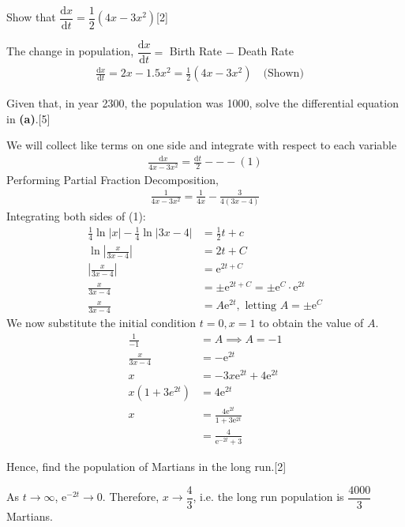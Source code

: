 \documentclass[12pt, a4 paper]{article}
\begin{document}
\begin{outline}[enumerate]
 \2 Show that $\dfrac{{{\textrm{d}}x}}{{{\textrm{d}}t}} = \dfrac{1}{2}(4x - 3{x^2})$\hfill[2]
 \begin{answer}
  The change in population, $\dfrac{{{\textrm{d}}x}}{{{\textrm{d}}t}} =$ Birth Rate $-$ Death Rate
  \begin{align*}
   \frac{{{\textrm{d}}x}}{{{\textrm{d}}t}} = 2x-1.5x^2 =\frac{1}{2}(4x - 3{x^2}) \quad\textrm{(Shown)}\quad
  \end{align*}
 \end{answer}
 \2 Given that, in year 2300, the population was 1000, solve the differential equation in \textbf{(a)}.\hfill[5]
 \begin{answer}
  We will collect like terms on one side and integrate with respect to each variable
  \begin{align*}
   \frac{\mathrm{d}x}{4x-3x^2} = \frac{\mathrm{d}t}{2} ---(1)
  \end{align*}
  Performing Partial Fraction Decomposition,
  \begin{align*}
   \frac{1}{4x-3x^2} = \frac{1}{4x} - \frac{3}{4(3x-4)}
  \end{align*}
  Integrating both sides of (1):
  \begin{align*}
   \frac{1}{4}\ln{|x|} - \frac{1}{4}\ln{|3x-4|} & = \frac{1}{2}t + c                                                 \\
   \ln{\left|\frac{x}{3x-4}\right|}             & = 2t + C                                                           \\
   \left|\frac{x}{3x-4}\right|                  & = \mathrm{e}^{2t+C}                                                \\
   \frac{x}{3x-4}                               & = \pm \mathrm{e}^{2t+C} = \pm \mathrm{e}^{C} \cdot \mathrm{e}^{2t} \\
   \frac{x}{3x-4}                               & = A\mathrm{e}^{2t},\textrm{ letting $A=\pm \mathrm{e}^{C}$}
  \end{align*}
  We now substitute the initial condition $t=0,x=1$ to obtain the value of $A$.
  \begin{align*}
   \frac{1}{-1}   & = A \implies A=-1                             \\
   \frac{x}{3x-4} & = -\mathrm{e}^{2t}                            \\
   x              & = -3x\mathrm{e}^{2t}+4\mathrm{e}^{2t}         \\
   x(1+3e^{2t})   & = 4\mathrm{e}^{2t}                            \\
   x              & = \frac{4\mathrm{e}^{2t}}{1+3\mathrm{e}^{2t}} \\
                  & = \frac{4}{\mathrm{e}^{-2t}+3}
  \end{align*}
 \end{answer}
 \2 Hence, find the population of Martians in the long run.\hfill[2]
 \begin{answer}
  As $t \rightarrow \infty$, $\mathrm{e}^{-2t} \rightarrow 0$. Therefore, $x \rightarrow \dfrac{4}{3}$, i.e. the long run population is $\dfrac{4000}{3}$ Martians.
 \end{answer}

\end{outline}
\end{document}
